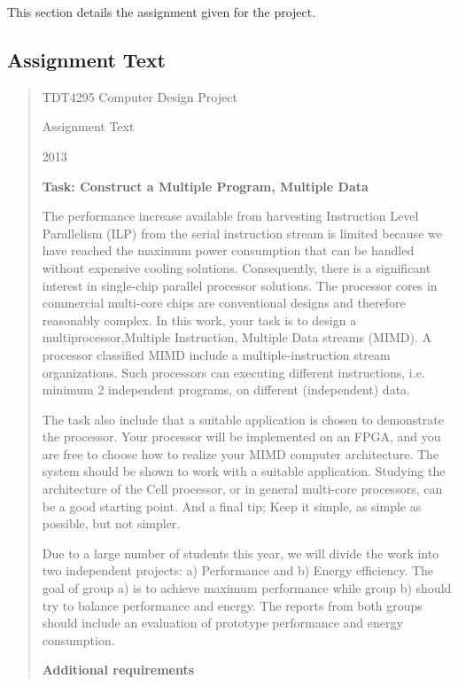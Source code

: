 
This section details the assignment given for the project.

\subsection{Assignment Text}
\label{subsection:assignment-text}

\begin{quote}

\begin{center}
TDT4295 Computer Design Project

Assignment Text

2013 
\end{center}
 
\textbf{Task: Construct a Multiple Program, Multiple Data}

The performance increase available from harvesting Instruction Level Parallelism (ILP) from the serial instruction stream is limited because we have reached the maximum power consumption that can be handled without expensive cooling solutions.
Consequently, there is a significant interest in single-chip parallel processor solutions.
The processor cores in commercial multi-core chips are conventional designs and therefore reasonably complex.
In this work, your task is to design a multiprocessor,Multiple Instruction, Multiple Data streams (MIMD).
A processor classified MIMD include a multiple-instruction stream organizations.
Such processors can executing different instructions, i.e. minimum 2 independent programs, on different (independent) data.

The task also include that a suitable application is chosen to demonstrate the processor.
Your processor will be implemented on an FPGA, and you are free to choose how to realize your MIMD computer architecture.
The system should be shown to work with a suitable application.
Studying the architecture of the Cell processor, or in general multi-core processors, can be a good starting point.
And a final tip; Keep it simple, as simple as possible, but not simpler.

Due to a large number of students this year, we will divide the work into two independent projects: a) Performance and b) Energy efficiency.
The goal of group a) is to achieve maximum performance while group b) should try to balance performance and energy.
The reports from both groups should include an evaluation of prototype performance and energy consumption.

\textbf{Additional requirements}


\end{quote}
